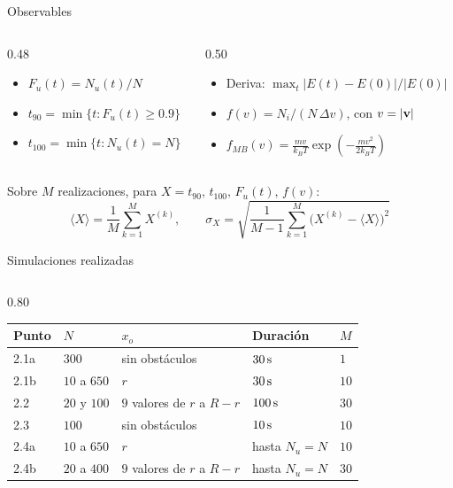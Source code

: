 \begin{frame}{Observables}
  \begin{columns}[T]
    \begin{column}{0.48\textwidth}
      \small
      \begin{itemize}\setlength{\itemsep}{12pt}
        \item $F_u(t) = N_u(t)/N$
        \item $t_{90} = \min\{t : F_u(t) \geq 0.9\}$
        \item $t_{100} = \min\{t : N_u(t) = N\}$
      \end{itemize}
    \end{column}
    \begin{column}{0.50\textwidth}
      \small
      \begin{itemize}\setlength{\itemsep}{12pt}
        \item Deriva: $\max_t |E(t) - E(0)|/|E(0)|$
        \item $f(v) = N_i/(N\,\Delta v)$, con $v = |\mathbf{v}|$
        \item $\displaystyle f_{MB}(v) = \frac{m v}{k_B T}\exp\!\left(-\frac{m v^2}{2 k_B T}\right)$
      \end{itemize}
    \end{column}
  \end{columns}
  \vspace{14pt}
  \small
  Sobre $M$ realizaciones, para $X = t_{90},\, t_{100},\, F_u(t),\, f(v)$:
  \[
    \langle X\rangle = \frac{1}{M}\sum_{k=1}^{M} X^{(k)},
    \qquad
    \sigma_X = \sqrt{\frac{1}{M-1}\sum_{k=1}^{M}\big(X^{(k)} - \langle X\rangle\big)^2}
  \]
\end{frame}

\begin{frame}{Simulaciones realizadas}
  \begin{columns}
    \begin{column}{0.80\textwidth}
      \centering
      \small
      \begin{tabular}{lllll}
        \hline
        Punto & $N$ & $x_o$ & Duración & $M$ \\
        \hline
        2.1a & $300$ & sin obstáculos & $30\,\mathrm{s}$ & $1$ \\
        2.1b & $10$ a $650$ & $r$ & $30\,\mathrm{s}$ & $10$ \\
        2.2 & $20$ y $100$ & $9$ valores de $r$ a $R - r$ & $100\,\mathrm{s}$ & $30$ \\
        2.3 & $100$ & sin obstáculos & $10\,\mathrm{s}$ & $10$ \\
        2.4a & $10$ a $650$ & $r$ & hasta $N_u = N$ & $10$ \\
        2.4b & $20$ a $400$ & $9$ valores de $r$ a $R - r$ & hasta $N_u = N$ & $30$ \\
        \hline
      \end{tabular}
    \end{column}
  \end{columns}
\end{frame}
